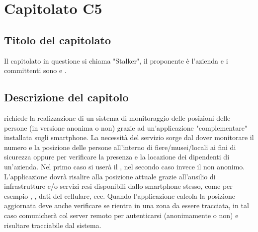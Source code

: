 \section{Capitolato C5}
\subsection{Titolo del capitolato}
Il capitolato in questione si chiama "Stalker", il proponente è l'azienda \Proponente{} e i committenti sono \VT{} e \CR{}.

\subsection{Descrizione del capitolo}
\NomeProgetto{} richiede la realizzazione di un sistema di monitoraggio delle posizioni delle persone (in versione anonima o non) grazie ad un'applicazione "complementare" installata sugli smartphone. La necessità del servizio sorge dal dover monitorare il numero e la posizione delle persone all'interno di fiere/musei/locali ai fini di sicurezza oppure per verificare la presenza e la locazione dei dipendenti di un'azienda. Nel primo caso si user\`a il , nel secondo caso invece il  non anonimo. L'applicazione dovrà risalire alla posizione attuale grazie all'ausilio di infrastrutture e/o servizi resi disponibili dallo smartphone stesso, come per esempio , , dati del cellulare, ecc. Quando l'applicazione calcola la posizione aggiornata deve anche verificare se rientra in una zona da essere tracciata, in tal caso comunicherà col server remoto per autenticarsi (anonimamente o non) e risultare tracciabile dal sistema. 

